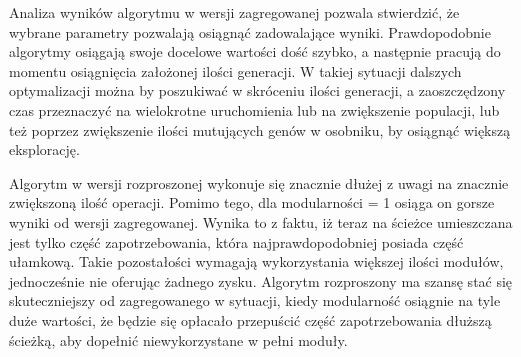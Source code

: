 Analiza wyników algorytmu w wersji zagregowanej pozwala stwierdzić, że wybrane parametry pozwalają osiągnąć zadowalające wyniki. Prawdopodobnie algorytmy osiągają swoje docelowe wartości dość szybko, a następnie pracują do momentu osiągnięcia założonej ilości generacji. W takiej sytuacji dalszych optymalizacji można by poszukiwać w skróceniu ilości generacji, a zaoszczędzony czas przeznaczyć na wielokrotne uruchomienia lub na zwiększenie populacji, lub też poprzez zwiększenie ilości mutujących genów w osobniku, by osiągnąć większą eksplorację.

Algorytm w wersji rozproszonej wykonuje się znacznie dłużej z uwagi na znacznie zwiększoną ilość operacji. Pomimo tego, dla modularności = 1 osiąga on gorsze wyniki od wersji zagregowanej. Wynika to z faktu, iż teraz na ścieżce umieszczana jest tylko część zapotrzebowania, która najprawdopodobniej posiada część ułamkową. Takie pozostałości wymagają wykorzystania większej ilości modułów, jednocześnie nie oferując żadnego zysku. Algorytm rozproszony ma szansę stać się skuteczniejszy od zagregowanego w sytuacji, kiedy modularność osiągnie na tyle duże wartości, że będzie się opłacało przepuścić część zapotrzebowania dłuższą ścieżką, aby dopełnić niewykorzystane w pełni moduły.

